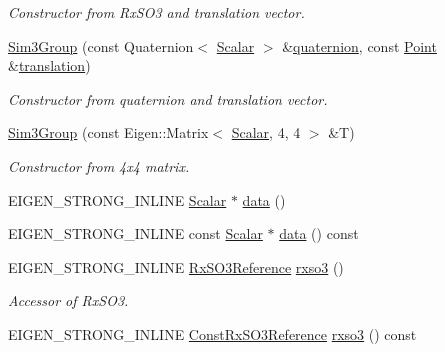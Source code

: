 \begin{DoxyCompactItemize}
\begin{DoxyCompactList}\small\item\em Constructor from Rx\+S\+O3 and translation vector. \end{DoxyCompactList}\item 
\hyperlink{class_sophus_1_1_sim3_group_a24b507674b877686c6dbd40a959abb09}{Sim3\+Group} (const Quaternion$<$ \hyperlink{class_sophus_1_1_sim3_group_a5db0ba2bb3fe2471006c9f366077c5bb}{Scalar} $>$ \&\hyperlink{class_sophus_1_1_sim3_group_base_a3629f9f036df49823d478e3692d23e82}{quaternion}, const \hyperlink{class_sophus_1_1_sim3_group_a1848018ed54875cbfe8fc437cb02237d}{Point} \&\hyperlink{class_sophus_1_1_sim3_group_ace8b98b369832930e647675b8c005d64}{translation})
\begin{DoxyCompactList}\small\item\em Constructor from quaternion and translation vector. \end{DoxyCompactList}\item 
\hyperlink{class_sophus_1_1_sim3_group_a178767e5571ad9e2f602e1c00fb28b61}{Sim3\+Group} (const Eigen\+::\+Matrix$<$ \hyperlink{class_sophus_1_1_sim3_group_a5db0ba2bb3fe2471006c9f366077c5bb}{Scalar}, 4, 4 $>$ \&T)
\begin{DoxyCompactList}\small\item\em Constructor from 4x4 matrix. \end{DoxyCompactList}\item 
E\+I\+G\+E\+N\+\_\+\+S\+T\+R\+O\+N\+G\+\_\+\+I\+N\+L\+I\+NE \hyperlink{class_sophus_1_1_sim3_group_a5db0ba2bb3fe2471006c9f366077c5bb}{Scalar} $\ast$ \hyperlink{class_sophus_1_1_sim3_group_ac422c2e56354fbf07e12e333345c6bd0}{data} ()
\item 
E\+I\+G\+E\+N\+\_\+\+S\+T\+R\+O\+N\+G\+\_\+\+I\+N\+L\+I\+NE const \hyperlink{class_sophus_1_1_sim3_group_a5db0ba2bb3fe2471006c9f366077c5bb}{Scalar} $\ast$ \hyperlink{class_sophus_1_1_sim3_group_a7b7c2858ddacde4c2a53d97d70d98ee3}{data} () const 
\item 
E\+I\+G\+E\+N\+\_\+\+S\+T\+R\+O\+N\+G\+\_\+\+I\+N\+L\+I\+NE \hyperlink{class_sophus_1_1_sim3_group_a0010f4f99876a2165913382fa69117d8}{Rx\+S\+O3\+Reference} \hyperlink{class_sophus_1_1_sim3_group_a4f8602d647961667444f0cb19fb553b1}{rxso3} ()\hypertarget{class_sophus_1_1_sim3_group_a4f8602d647961667444f0cb19fb553b1}{}\label{class_sophus_1_1_sim3_group_a4f8602d647961667444f0cb19fb553b1}

\begin{DoxyCompactList}\small\item\em Accessor of Rx\+S\+O3. \end{DoxyCompactList}\item 
E\+I\+G\+E\+N\+\_\+\+S\+T\+R\+O\+N\+G\+\_\+\+I\+N\+L\+I\+NE \hyperlink{class_sophus_1_1_sim3_group_a47e81f13e85164a1372395d978ab86fe}{Const\+Rx\+S\+O3\+Reference} \hyperlink{class_sophus_1_1_sim3_group_a54af37f660dccf8c687d7c714fb46234}{rxso3} () const \hypertarget{class_sophus_1_1_sim3_group_a54af37f660dccf8c687d7c714fb46234}{}\label{class_sophus_1_1_sim3_group_a54af37f660dccf8c687d7c714fb46234}


\end{DoxyCompactItemize}
